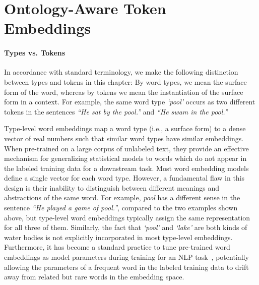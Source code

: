 
\section{Ontology-Aware Token Embeddings}
\paragraph{Types vs. Tokens} In accordance with standard terminology, we make
the following distinction 
between types and tokens in this chapter: By word types, we mean the surface form 
of the word, whereas by tokens we mean the instantiation of the surface form in 
a context. For example, the same word type \textit{`pool'} occurs as two 
different tokens in the sentences \textit{``He sat by the pool.''} and 
\textit{``He swam in the pool.''}

Type-level word embeddings map a word type (i.e., a surface form) to a dense 
vector of real numbers such that similar word types have similar embeddings. 
When pre-trained on a large corpus of unlabeled text, they provide an effective 
mechanism for generalizing statistical models to words which do not appear in 
the labeled training data for a downstream task. Most word embedding models 
define a single vector for each word type. However, a 
fundamental flaw in this design is their inability to distinguish between 
different meanings and abstractions of the same word. For example,
\textit{pool} has a different sense in the sentence \textit{``He played a game of pool.''},
compared to the two examples shown above, but type-level word embeddings typically
assign the same representation for all three of them. Similarly, the fact that 
\textit{`pool'} and \textit{`lake'} are both kinds of water bodies is not 
explicitly incorporated in most type-level embeddings.
Furthermore, it has become a standard practice to tune pre-trained word 
embeddings as model parameters during training for an NLP
task~\cite[e.g.,][]{chen:14,lample:16}, potentially allowing the parameters of a 
frequent word in the labeled training data to drift away from related but rare 
words in the embedding space. 


